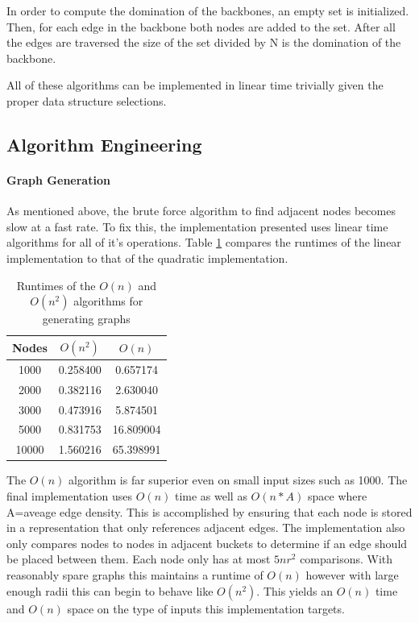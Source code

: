\documentclass{article}
\begin{document}
    In order to compute the domination of the backbones, an empty set is initialized.
    Then, for each edge in the backbone both nodes are added to the set.
    After all the edges are traversed the size of the set divided by N is the domination of the backbone.

    All of these algorithms can be implemented in linear time trivially given the proper data structure selections.

  \subsection{Algorithm Engineering}
    \paragraph{Graph Generation}
    As mentioned above, the brute force algorithm to find adjacent nodes becomes slow at a fast rate.
    To fix this, the implementation presented uses linear time algorithms for all of it's operations.
	  Table \ref{runtime_comparison_table_brute} compares the runtimes of the linear implementation to that of the quadratic implementation.

	  \begin{table}
      \centering
      \label{runtime_comparison_table_brute}
  		\begin{tabular}{ |c|c|c| }
  			\hline
  			Nodes & $O(n^2)$ & $O(n)$ \\
  			\hline
  			  1000 & 0.258400 & 0.657174 \\
  			  \hline
  			  2000 & 0.382116 & 2.630040 \\
  			  \hline
  			  3000 & 0.473916 & 5.874501 \\
  			  \hline
  			  5000 & 0.831753 & 16.809004 \\
  			  \hline
  			  10000 & 1.560216 & 65.398991 \\
  			\hline
  		\end{tabular}
  		\caption{Runtimes of the $O(n)$ and $O(n^2)$ algorithms for generating graphs}
	  \end{table}

	  The $O(n)$ algorithm is far superior even on small input sizes such as 1000.
    The final implementation uses $O(n)$ time as well as $O(n*A)$ space where A=aveage edge density.
    This is accomplished by ensuring that each node is stored in a representation that only references adjacent edges.
    The implementation also only compares nodes to nodes in adjacent buckets to determine if an edge should be placed between them.
    Each node only has at most $5nr^2$ comparisons\cite{chen2017bipartite}.
    With reasonably spare graphs this maintains a runtime of $O(n)$ however with large enough radii this can begin to behave like $O(n^2)$.
    This yields an $O(n)$ time and $O(n)$ space on the type of inputs this implementation targets.
\end{document}
